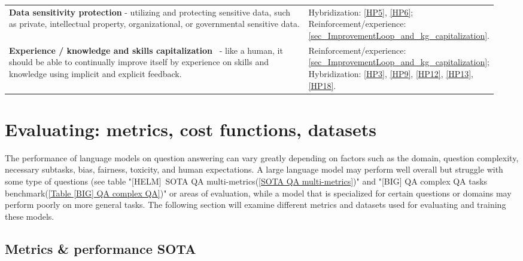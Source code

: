 \documentclass[acmsmall]{acmart}
\begin{document}
{\begin{longtable}{p{0.7\linewidth} >{\tiny}p{0.25\linewidth}}
\textbf{Data sensitivity protection} - utilizing and protecting sensitive data, such as private, intellectual property, organizational, or governmental sensitive data.
&
    Hybridization: \ref{HP5}, \ref{HP6};
    Reinforcement/experience: \ref{sec_ImprovementLoop_and_kg_capitalization}.
\\

\textbf{Experience / knowledge and skills capitalization}~\citep{openaiGPT4TechnicalReport2023} - like a human, it should be able to continually improve itself by experience on skills and knowledge using implicit and explicit feedback.
&
    Reinforcement/experience: \ref{sec_ImprovementLoop_and_kg_capitalization};
    Hybridization: \ref{HP3}, \ref{HP9}, \ref{HP12}, \ref{HP13}, \ref{HP18}.
\\
\end{longtable}}


\section{Evaluating: metrics, cost functions, datasets}\label{sec_evaluation}
The performance of language models on question answering can vary greatly depending on factors such as the domain, question complexity, necessary subtasks, bias, fairness, toxicity, and human expectations. A large language model may perform well overall but struggle with some type of questions (see table "[HELM] SOTA QA multi-metrics(\ref{SOTA QA multi-metrics})" and "[BIG] QA complex QA tasks benchmark(\ref{Table [BIG] QA complex QA})" or areas of evaluation, while a model that is specialized for certain questions or domains may perform poorly on more general tasks. The following section will examine different metrics and datasets used for evaluating and training these models.
\subsection{Metrics \& performance SOTA}\label{sec_metricsSOTA}
\end{document}
